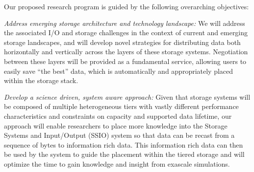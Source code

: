 % 
Our proposed research program is guided by the following overarching objectives:
\begin{tightItemize}
\item
{\em Address emerging storage architecture and technology landscape:}
We will address the associated I/O and storage challenges in the context of
current and emerging storage landscapes,
and will develop novel strategies for distributing 
data both horizontally and vertically across the layers of these storage systems.  
Negotiation between these layers will be provided as a fundamental service, allowing users to
easily save ``the best''  data, which is automatically and appropriately placed within the
 storage stack.
\item
{\em Develop a science driven, system aware approach:}
%
Given that storage systems will be composed of multiple heterogeneous tiers with
vastly different performance characteristics and constraints on capacity and 
supported data lifetime, our approach will enable researchers to 
place more knowledge into the Storage Systems and Input/Output (SSIO) system 
so that data can be recast from a sequence of bytes to information rich data. This 
information rich data can then be used by the system to guide the  placement within 
the tiered storage and will optimize the time to gain knowledge and insight from 
exascale simulations.



\end{tightItemize}
